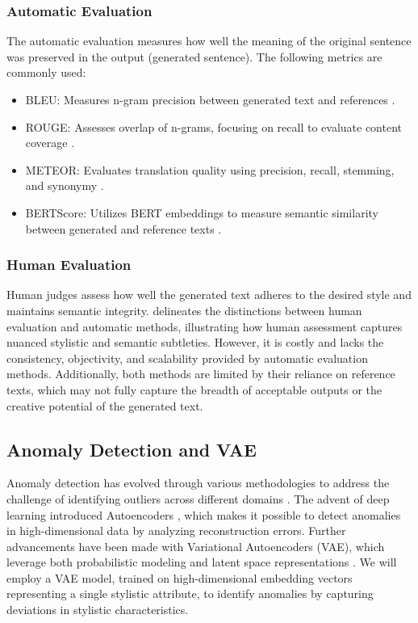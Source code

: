 \subsubsection{Automatic Evaluation}
The automatic evaluation measures how well the meaning of the original sentence was preserved in the output (generated sentence). The following metrics are commonly used:
\begin{itemize}
    \item BLEU: Measures n-gram precision between generated text and references \cite{papineni-etal-2002-bleu}.
    \item ROUGE: Assesses overlap of n-grams, focusing on recall to evaluate content coverage \cite{lin-2004-rouge}.
    \item METEOR: Evaluates translation quality using precision, recall, stemming, and synonymy \cite{banerjee-lavie-2005-meteor}.
    \item BERTScore: Utilizes BERT embeddings to measure semantic similarity between generated and reference texts \cite{zhang2020bertscoreevaluatingtextgeneration}.
\end{itemize}

\subsubsection{Human Evaluation}
Human judges assess how well the generated text adheres to the desired style and maintains semantic integrity. \cite{Yamshchikov_2021} delineates the distinctions between human evaluation and automatic methods, illustrating how human assessment captures nuanced stylistic and semantic subtleties. However, it is costly and lacks the consistency, objectivity, and scalability provided by automatic evaluation methods. Additionally, both methods are limited by their reliance on reference texts, which may not fully capture the breadth of acceptable outputs or the creative potential of the generated text. 

\subsection{Anomaly Detection and VAE}
Anomaly detection has evolved through various methodologies to address the challenge of identifying outliers across different domains \cite{NIPS1999_8725fb77, 4781136}. The advent of deep learning introduced Autoencoders \cite{article}, which makes it possible to detect anomalies in high-dimensional data by analyzing reconstruction errors. Further advancements have been made with Variational Autoencoders (VAE), which leverage both probabilistic modeling and latent space representations \cite{kingma2022autoencodingvariationalbayes}. We will employ a VAE model, trained on high-dimensional embedding vectors representing a single stylistic attribute, to identify anomalies by capturing deviations in stylistic characteristics.

